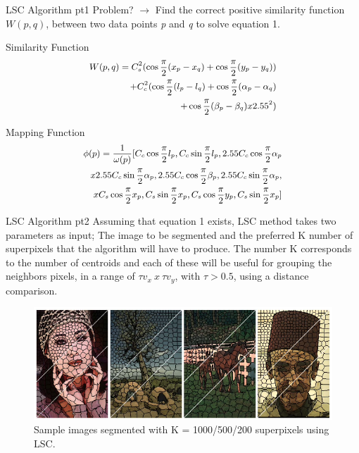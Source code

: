\documentclass[10pt]{beamer}
\begin{document}
\begin{frame}{LSC Algorithm pt1}
    Problem? $ \rightarrow $ Find the correct positive similarity function $ W (p,q) $, 
    between two data points \emph{p} and \emph{q} to solve equation 1.
    \begin{block}{Similarity Function}
        \begin{equation}\small
            \begin{split}
                W(p,q) = C_s^2(\cos \frac{\pi}{2}(x_p-x_q)+\cos\frac{\pi}{2}(y_p-y_q)) \\
                + C_c^2(\cos \frac{\pi}{2}(l_p-l_q)+\cos\frac{\pi}{2}(\alpha_p-\alpha_q) \\
                + \cos\frac{\pi}{2}(\beta_p-\beta_q)x2.55^2)
            \end{split}
        \end{equation}
    \end{block}
    
    \begin{block}{Mapping Function}
        \begin{equation}\small
            \begin{split}
                \phi(p) = \frac{1}{\omega(p)}[C_c\cos\frac{\pi}{2}l_p, C_c\sin\frac{\pi}{2}l_p, 2.55C_c\cos\frac{\pi}{2}\alpha_p \\
                x 2.55C_c\sin\frac{\pi}{2}\alpha_p, 2.55C_c\cos\frac{\pi}{2}\beta_p, 2.55C_c\sin\frac{\pi}{2}\alpha_p, \\
                x C_s\cos\frac{\pi}{2}x_p, C_s\sin\frac{\pi}{2}x_p, C_s\cos\frac{\pi}{2}y_p, C_s\sin\frac{\pi}{2}x_p]
            \end{split}
        \end{equation} 
    \end{block}
    
\end{frame}

\begin{frame}{LSC Algorithm pt2}
    Assuming that equation 1 exists, LSC method takes two parameters as 
    input; The image to be segmented and the preferred K number of 
    superpixels that the algorithm will have to produce. The number K 
    corresponds to the number of centroids and each of these will be useful 
    for grouping the neighbors pixels, in a range of $ \tau v_x \ x \ \tau v_y $, with $ \tau>0.5 $, 
    using a distance comparison.
    \begin{figure}[h!]
        \centering
        \includegraphics[width = 0.7 \linewidth]{paper2/slide1.png}
        \centering
        \caption{Sample images segmented with K = 1000/500/200 superpixels using LSC.}
        \label{fig: metrics}
    \end{figure}
\end{frame}
\end{document}
